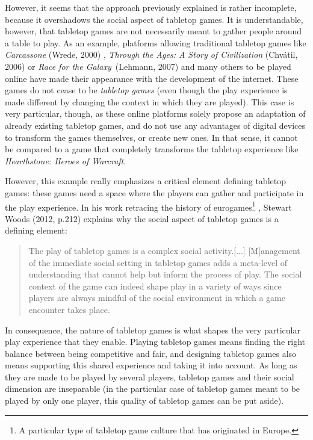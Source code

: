 However, it seems that the approach previously explained is rather incomplete, because it overshadows the social aspect of tabletop games. It is understandable, however, that tabletop games are not necessarily meant to gather people around a table to play. As an example, platforms allowing traditional tabletop games like \textit{Carcassone} (Wrede, 2000) \cite{game:carca}, \textit{Through the Ages: A Story of Civilization} (Chvátil, 2006) \cite{game:ages} or \textit{Race for the Galaxy}\ (Lehmann, 2007) \cite{game:race} and many others to be played online have made their appearance with the development of the internet.
These games do not cease to be \textit{tabletop games} (even though the play experience is made different by changing the context in which they are played). This case is very particular, though, as these online platforms solely propose an adaptation of already existing tabletop games, and do not use any advantages of digital devices to transform the games themselves, or create new ones. 
In that sense, it cannot be compared to a game that completely transforms the tabletop experience like \textit{Hearthstone: Heroes of Warcraft}. 

However, this example really emphasizes a critical element defining tabletop games: these games need a space where the players can gather and participate in the play experience. In his work retracing the history of eurogames\footnote{A particular type of tabletop game culture that has originated in Europe.}
, Stewart Woods (2012, p.212) \cite{book:euro} explains why the social aspect of tabletop games is a defining element:

\begin{quotation}
The play of tabletop games is a complex social activity.[...] [M]anagement of the immediate social setting in tabletop games adds a meta-level of understanding that cannot help but inform the process of play. The social context of the game can indeed shape play in a variety of ways since players are always mindful of the social environment in which a game encounter takes place.
\end{quotation}

In consequence, the nature of tabletop games is what shapes the very particular play experience that they enable. Playing tabletop games means finding the right balance between being competitive and fair, and designing tabletop games also means supporting this shared experience and taking it into account. As long as they are made to be played by several players, tabletop games and their social dimension are inseparable (in the particular case of tabletop games meant to be played by only one player, this quality of tabletop games can be put aside).


